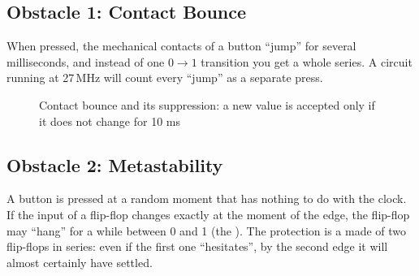 \subsection{Obstacle 1: Contact Bounce}

When pressed, the mechanical contacts of a button ``jump'' for several milliseconds, and
instead of one $0\to1$ transition you get a whole series. A circuit running
at 27\,MHz will count every ``jump'' as a separate press.

\begin{figure}[H]
\centering
{}
\caption{Contact bounce and its suppression: a new value is accepted only
if it does not change for 10 ms}
\end{figure}

\subsection{Obstacle 2: Metastability}

A button is pressed at a random moment that has nothing to do with the  clock.
If the input of a flip-flop changes exactly at the moment of the edge, the flip-flop may
``hang'' for a while between 0 and 1 (the ). The protection
is a  made of two flip-flops in series: even
if the first one ``hesitates'', by the second edge it will almost certainly have settled.

